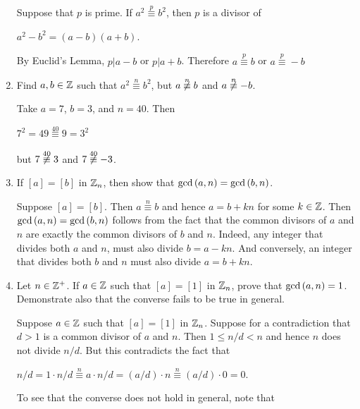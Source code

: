 \documentclass[11pt,fleqn,dvipsnames,usenames]{article}
\newcommand{\p}{\noindent}
\begin{document}
\begin{enumerate}
\solution Suppose that $p$ is prime.  If $a^2\overset{p}{\equiv}b^2$, then $p$ is a divisor of
\begin{center}
$a^2 - b^2 = (a-b)(a+b)$.
\end{center}
By Euclid's Lemma, $p|a-b$ or $p|a+b$.  Therefore $a\overset{p}{\equiv}b$ or $a\overset{p}{\equiv}-b$
\item Find $a,b\in\mathbb{Z}$ such that $a^2\overset{n}{\equiv}b^2$, but $a\not\overset{n}{\equiv}b$ and $a\not\overset{n}{\equiv}-b$.
\vsmsp

\solution Take $a = 7$, $b=3$, and $n=40$.  Then
\begin{center}
$7^2 = 49 \overset{40}{\equiv}9 = 3^2$
\end{center}
but $7\not\overset{40}{\equiv}3$ and $7\not\overset{40}{\equiv}-3$.

\item If $[a] = [b]$ in $\mathbb{Z}_{n}$, then show that $\text{gcd}\left(a,n\right) = \text{gcd}\left(b,n\right)$.
\vsmsp

\solution Suppose $[a] = [b]$.  Then $a\overset{n}{\equiv}b$ and hence $a = b + kn$ for some $k\in\mathbb{Z}$.  Then $\text{gcd}\left(a,n\right) = \text{gcd}\left(b,n\right)$ follows from the fact that the common divisors of $a$ and $n$ are exactly the common divisors of $b$ and $n$.  Indeed, any integer that divides both $a$ and $n$, must also divide $b = a - kn$.  And conversely, an integer that divides both $b$ and $n$ must also divide $a = b + kn$.

\item Let $n\in\mathbb{Z}^{+}$.  If $a\in \mathbb{Z}$ such that $[a] = [1]$ in $\mathbb{Z}_{n}$, prove that $\text{gcd}\left(a,n\right) = 1$.  Demonstrate also that the converse fails to be true in general.
\vsmsp

\solution Suppose $a\in\mathbb{Z}$ such that $[a] = [1]$ in $\mathbb{Z}_{n}$.  Suppose for a contradiction that $d>1$ is a common divisor of $a$ and $n$.  Then $1 \leq n/d < n$ and hence $n$ does not divide $n/d$.  But this contradicts the fact that
\begin{center}
$n/d = 1\cdot n/d \overset{n}{\equiv} a\cdot n/d = (a/d)\cdot n \overset{n}{\equiv}(a/d)\cdot 0 = 0$.
\end{center}
\vsmsp

\p To see that the converse does not hold in general, note that 


\end{enumerate}
\end{document}

